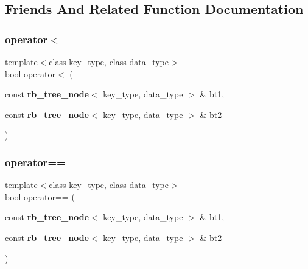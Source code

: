 \subsection{Friends And Related Function Documentation}
\mbox{\label{structcop5536_1_1rb__tree__node_a415f719d7308cb6e24971103a949ecef}} 
\subsubsection{operator$<$}
{\footnotesize\ttfamily template$<$class key\+\_\+type, class data\+\_\+type$>$ \\
bool operator$<$ (\begin{DoxyParamCaption}\item[{const \textbf{ rb\+\_\+tree\+\_\+node}$<$ key\+\_\+type, data\+\_\+type $>$ \&}]{bt1,  }\item[{const \textbf{ rb\+\_\+tree\+\_\+node}$<$ key\+\_\+type, data\+\_\+type $>$ \&}]{bt2 }\end{DoxyParamCaption})\hspace{0.3cm}{\ttfamily [friend]}}

\mbox{\label{structcop5536_1_1rb__tree__node_a75d1567668b0119a84a1b80114c17684}} 
\subsubsection{operator==}
{\footnotesize\ttfamily template$<$class key\+\_\+type, class data\+\_\+type$>$ \\
bool operator== (\begin{DoxyParamCaption}\item[{const \textbf{ rb\+\_\+tree\+\_\+node}$<$ key\+\_\+type, data\+\_\+type $>$ \&}]{bt1,  }\item[{const \textbf{ rb\+\_\+tree\+\_\+node}$<$ key\+\_\+type, data\+\_\+type $>$ \&}]{bt2 }\end{DoxyParamCaption})\hspace{0.3cm}{\ttfamily [friend]}}


